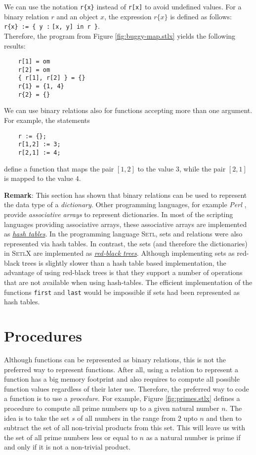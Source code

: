 We can use the notation  \texttt{r\{x\}} instead of \texttt{r[x]} to avoid undefined values.
For a binary relation $r$ and an object $x$, the expression $r\{x\}$ is defined as
follows: 
\\[0.2cm]
\hspace*{1.3cm} 
\texttt{r\{x\} := \{ y :$\;$[x, y] in r \}}.
\\[0.2cm]
Therefore, the  program from Figure \ref{fig:buggy-map.stlx} yields the following results:
\begin{verbatim}
    r[1] = om
    r[2] = om
    { r[1], r[2] } = {}
    r{1} = {1, 4}
    r{2} = {}
\end{verbatim}

We can use binary relations also for functions accepting more than one argument.  For example, the
statements
\begin{verbatim}
    r := {};
    r[1,2] := 3;
    r[2,1] := 4;
\end{verbatim}
define a function that maps the pair $[1,2]$ to the value $3$, while the pair $[2,1]$ is mapped to
the value $4$.
\vspace*{0.2cm}

\noindent
\textbf{Remark}:
This section has shown that binary relations can be used to represent the data type of a
\emph{dictionary}.  Other programming languages, for example \textsl{Perl} \cite{Wall92},
provide \emph{associative arrays} to represent dictionaries.  In most of the scripting languages
providing associative arrays, these associative arrays are implemented as 
\href{http://en.wikipedia.org/wiki/Hash_table}{\emph{hash tables}}.  In the programming language
\textsc{Setl}, sets and relations were also represented via hash tables.
In contrast, the sets (and therefore the dictionaries) in \textsc{SetlX} are implemented as 
\href{http://en.wikipedia.org/wiki/Red-black_tree}{\emph{red-black trees}}.
Although implementing sets as red-black trees is slightly slower than a hash table based
implementation, the advantage of using red-black trees is that they support a number of operations
that are not available when using hash-tables.  The efficient implementation of the functions \texttt{first}
and \texttt{last} would be impossible if sets had been represented as hash tables.


\section{Procedures}
Although functions can be represented as binary relations, this is not the preferred way
to represent functions.  After all, using a relation to represent a function
has a big memory footprint and also requires to compute all possible function
values regardless of their later use.  Therefore, the preferred way to code a function is
to use a \emph{procedure}.  For example, Figure \ref{fig:primes.stlx} defines a procedure
to compute all 
prime numbers up to a given natural number $n$.  The idea is to take the set $s$ of all numbers in
the range from $2$ upto $n$ and then to subtract the set of all non-trivial
products from this set.  This will leave us with the set of all prime numbers less or
equal to $n$ as a natural number is prime if and only if it is not a non-trivial product.

